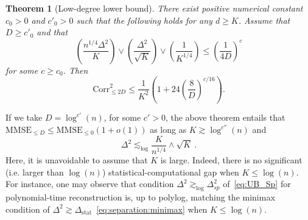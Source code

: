 \documentclass{article}
\newcommand{\alex}[1]{\textcolor{magenta}{[alex: #1]}}
\newtheorem{theorem}{Theorem}
\begin{document}
        \begin{theorem}[Low-degree lower bound]\label{thm:LB_polynomial}
         There exist positive numerical constant $c_0>0$ and $c'_0>0$ such that the following holds for any $d\geq K$. Assume that $D\geq c'_0$ and that 
        \[
        \left(\frac{n^{1/4}\Delta^2}{K}\right)\vee \left(\frac{\Delta^2}{\sqrt{K}}\right)\vee \left(\frac{1}{K^{1/4}}\right)\leq  \left(\frac{1}{4D}\right)^{c}
        \]
        for some $c\geq c_0$. Then 
            $$\mathrm{Corr}^2_{\leq 2D} \leq \frac{1}{K^{2}} \left(1+24\left(\frac{8}{D}\right)^{c/16}\right).$$
        \end{theorem}
         

If we take $D= \log^{c'}(n)$, for some $c'>0$, the above theorem entails that  $\mathrm{MMSE}_{\leq D}\leq \mathrm{MMSE}_{\leq 0}(1+o(1))$ as long as $K\gtrsim \log^{c''}(n)$ and
\[
\Delta^2 \lesssim_{\log}  \frac{K}{n^{1/4}}\wedge \sqrt{K}\ . 
\]
Here, it is unavoidable to assume that $K$ is large. Indeed, there is no significant (i.e. larger than $\log(n)$) statistical-computational gap when $K\leq \log(n)$. For instance, one may observe that condition $\Delta^2 \gtrsim_{\log} \Delta^2_{sp}$ of~\eqref{eq:UB_Sp} for polynomial-time reconstruction is, up to polylog, matching the minimax condition of $\Delta^2\gtrsim \Delta_{\mathrm{stat}}$~\eqref{eq:separation:minimax} when $K\leq \log(n)$. 








\end{document}
